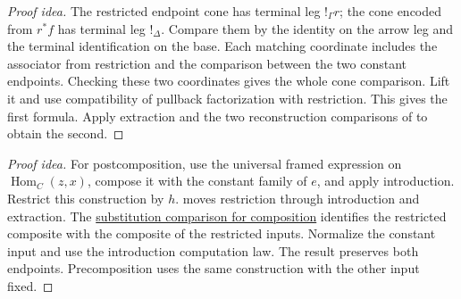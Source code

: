 \documentclass[11pt]{article}
\begin{document}
\begin{proof}[Proof idea]
The restricted endpoint cone has terminal leg $!_\Gamma r$; the cone
encoded from $r^*f$ has terminal leg $!_\Delta$. Compare them by the
identity on the arrow leg and the terminal identification on the base.
Each matching coordinate includes the associator from restriction and
the comparison between the two constant endpoints. Checking these two
coordinates gives the whole cone comparison.
Lift it and use compatibility of pullback factorization with restriction.
This gives the first formula. Apply extraction and the two reconstruction
comparisons of  to obtain the second.
\end{proof}

\begin{proof}[Proof idea]
For postcomposition, use the universal framed expression on
$\operatorname{Hom}_C(z,x)$, compose it with the constant family of $e$,
and apply introduction. Restrict this construction by $h$.
 moves restriction through
introduction and extraction. The
\href{supplementary-substitution-in-morphism-expressions.html}{substitution comparison
for composition} identifies the restricted composite with the composite
of the restricted inputs. Normalize the constant input and use the
introduction computation law. The result preserves both endpoints.
Precomposition uses the same construction with the other input fixed.
\end{proof}
\end{document}
